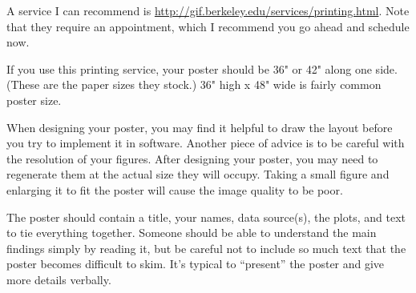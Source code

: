\documentclass[11pt, oneside]{article}   	%
\begin{document}

A service I can recommend is
\url{http://gif.berkeley.edu/services/printing.html}. Note that they require an
appointment, which I recommend you go ahead and schedule now.

If you use this printing service, your poster should be 36" or 42" along one
side. (These are the paper sizes they stock.) 36" high x 48" wide is fairly
common poster size.

When designing your poster, you may find it helpful to draw the layout before
you try to implement it in software. Another piece of advice is to be careful
with the resolution of your figures. After designing your poster, you may need
to regenerate them at the actual size they will occupy. Taking a small figure
and enlarging it to fit the poster will cause the image quality to be poor.

The poster should contain a title, your names, data source(s), the plots, and
text to tie everything together. Someone should be able to understand the main
findings simply by reading it, but be careful not to include so much text that
the poster becomes difficult to skim. It's typical to ``present'' the poster and
give more details verbally.
\end{document}
